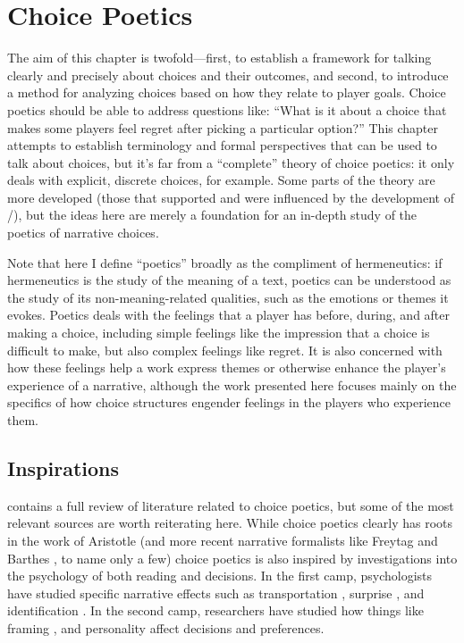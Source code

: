\chapter{Choice Poetics}

\label{ch:choice-poetics}


The aim of this chapter is twofold---first, to establish a framework for talking clearly and precisely about choices and their outcomes, and second, to introduce a method for analyzing choices based on how they relate to player goals.
%
Choice poetics should be able to address questions like: ``What is it about a choice that makes some players feel regret after picking a particular option?''
%
This chapter attempts to establish terminology and formal perspectives that can be used to talk about choices, but it's far from a ``complete'' theory of choice poetics: it only deals with explicit, discrete choices, for example.
%
Some parts of the theory are more developed (those that supported and were influenced by the development of \dunyazad/), but the ideas here are merely a foundation for an in-depth study of the poetics of narrative choices.


Note that here I define ``poetics'' broadly as the compliment of hermeneutics: if hermeneutics is the study of the meaning of a text, poetics can be understood as the study of its non-meaning-related qualities, such as the emotions or themes it evokes.
%
Poetics deals with the feelings that a player has before, during, and after making a choice, including simple feelings like the impression that a choice is difficult to make, but also complex feelings like regret.
%
It is also concerned with how these feelings help a work express themes or otherwise enhance the player's experience of a narrative, although the work presented here focuses mainly on the specifics of how choice structures engender feelings in the players who experience them.


\section{Inspirations}

 contains a full review of literature related to choice poetics, but some of the most relevant sources are worth reiterating here.
%
While choice poetics clearly has roots in the work of Aristotle \citep{Aristotle1917} (and more recent narrative formalists like Freytag \citep{Freytag1894} and Barthes \citep{Barthes1975}, to name only a few) choice poetics is also inspired by investigations into the psychology of both reading and decisions.
%
In the first camp, psychologists have studied specific narrative effects such as transportation \citep{Green2000}, surprise \citep{Iran-Nejad1987}, and identification \citep{Oatley1995}.
%
In the second camp, researchers have studied how things like framing \citep{Tversky1981,Tversky1993}, and personality \citep{Schwartz2002} affect decisions and preferences.


